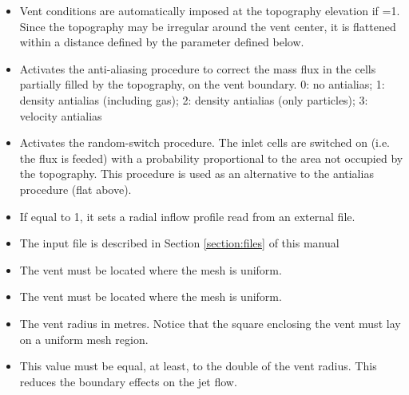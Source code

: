 \begin{itemize}
\item
{}
{Vent conditions are automatically imposed at the topography elevation
if =1. Since the topography may be irregular around the vent
center, it is flattened within a distance defined by the parameter
 defined below.}

\item
{}
{Activates the anti-aliasing procedure to correct the mass flux in the cells
partially filled by the topography, on the vent boundary. 0: no antialias;
1: density antialias (including gas); 2: density antialias (only particles); 
3: velocity antialias}

\item
{}
{Activates the random-switch procedure. The inlet cells are switched on
(i.e. the flux is feeded) with a probability proportional to the area not 
occupied by the topography. This procedure is used as an alternative to
the antialias procedure (flat  above).}

\item
{}
{If equal to 1, it sets a radial inflow profile read from an external 
file.}

\item
{}
{The input file is described in Section \ref{section:files} of this manual}

\item
{}
{The vent must be located where the mesh is uniform.}

\item
{}
{The vent must be located where the mesh is uniform.}

\item
{}
{The vent radius in metres. Notice that the square enclosing the vent
 must lay on a uniform mesh region.}

\item
{}
{This value must be equal, at least, to the double of the vent radius. This
reduces the boundary effects on the jet flow.}


\end{itemize}
